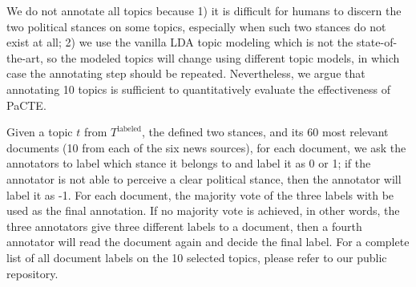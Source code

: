 \documentclass[11pt]{article}
\begin{document}
We do not annotate all topics because 1) it is difficult for humans to discern the two political stances on some topics, especially when such two stances do not exist at all; 2) we use the vanilla LDA topic modeling which is not the state-of-the-art, so the modeled topics will change using different topic models, in which case the annotating step should be repeated. Nevertheless, we argue that annotating 10 topics is sufficient to quantitatively evaluate the effectiveness of PaCTE.


Given a topic $t$ from $T^{\text{labeled}}$, the defined two stances, and its 60 most relevant documents (10 from each of the six news sources), for each document, we ask the annotators to label which stance it belongs to and label it as 0 or 1; if the annotator is not able to perceive a clear political stance, then the annotator will label it as -1. For each document, the majority vote of the three labels with be used as the final annotation. If no majority vote is achieved, in other words, the three annotators give three different labels to a document, then a fourth annotator will read the document again and decide the final label. For a complete list of all document labels on the 10 selected topics, please refer to our public repository.
\end{document}
